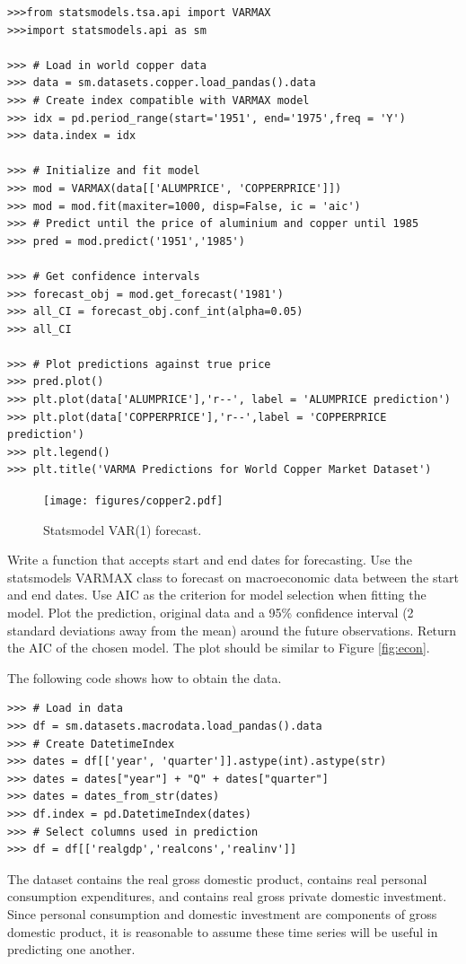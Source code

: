 \begin{lstlisting}
>>>from statsmodels.tsa.api import VARMAX
>>>import statsmodels.api as sm

>>> # Load in world copper data
>>> data = sm.datasets.copper.load_pandas().data
>>> # Create index compatible with VARMAX model
>>> idx = pd.period_range(start='1951', end='1975',freq = 'Y')
>>> data.index = idx

>>> # Initialize and fit model
>>> mod = VARMAX(data[['ALUMPRICE', 'COPPERPRICE']])
>>> mod = mod.fit(maxiter=1000, disp=False, ic = 'aic')
>>> # Predict until the price of aluminium and copper until 1985
>>> pred = mod.predict('1951','1985')

>>> # Get confidence intervals
>>> forecast_obj = mod.get_forecast('1981')
>>> all_CI = forecast_obj.conf_int(alpha=0.05)
>>> all_CI

>>> # Plot predictions against true price
>>> pred.plot()
>>> plt.plot(data['ALUMPRICE'],'r--', label = 'ALUMPRICE prediction')
>>> plt.plot(data['COPPERPRICE'],'r--',label = 'COPPERPRICE prediction')
>>> plt.legend()
>>> plt.title('VARMA Predictions for World Copper Market Dataset')
\end{lstlisting}

\begin{figure}[H]
\centering
\texttt{[image: figures/copper2.pdf]}
\caption{Statsmodel VAR(1) forecast.}
\label{fig:varma}
\end{figure}

\begin{problem}
\label{prob:arma:smvarma}

Write a function  that accepts start and end dates for forecasting.
Use the statsmodels VARMAX class to forecast on macroeconomic data between the start and end dates.
Use AIC as the criterion for model selection when fitting the model.
Plot the prediction, original data and a 95\% confidence interval (2 standard deviations away from the mean) around the future observations.
Return the AIC of the chosen model.
The plot should be similar to Figure \ref{fig:econ}.

The following code shows how to obtain the data.

\begin{lstlisting}
>>> # Load in data
>>> df = sm.datasets.macrodata.load_pandas().data
>>> # Create DatetimeIndex
>>> dates = df[['year', 'quarter']].astype(int).astype(str)
>>> dates = dates["year"] + "Q" + dates["quarter"]
>>> dates = dates_from_str(dates)
>>> df.index = pd.DatetimeIndex(dates)
>>> # Select columns used in prediction
>>> df = df[['realgdp','realcons','realinv']]
\end{lstlisting}

The dataset  contains the real gross domestic product,  contains real personal consumption expenditures, and  contains real gross private domestic investment.
Since personal consumption and domestic investment are components of gross domestic product, it is reasonable to assume these time series will be useful in predicting one another.

\end{problem}

